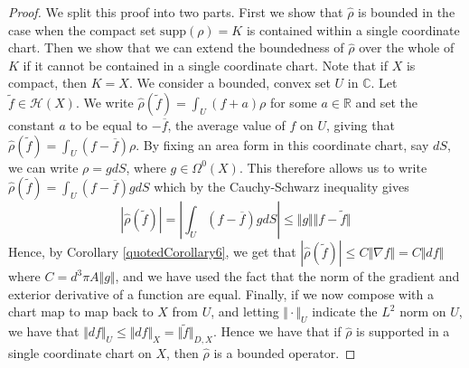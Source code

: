 \documentclass[11pt]{report}
\theoremstyle{definition}
\begin{document}
\begin{proof}
  We split this proof into two parts. First we show that $\hat{\rho}$ is bounded in the case when the compact set $\text{supp}(\rho) = K$ is contained within a single coordinate chart. Then we show that we can extend the boundedness of $\hat{\rho}$ over the whole of $K$ if it cannot be contained in a single coordinate chart. Note that if $X$ is compact, then $K=X$. We consider a bounded, convex set $U$ in $\mathbb{C}$. Let $\tilde{f} \in \mathcal{H}(X)$. We write $\hat{\rho}(\tilde{f}) = \int_U (f + a) \rho$ for some $a \in \mathbb{R}$ and set the constant $a$ to be equal to $-\overline{f}$, the average value of $f$ on $U$, giving that  $\hat{\rho}(\tilde{f}) = \int_U (f - \overline{f}) \rho$. By fixing an area form in this coordinate chart, say $dS$, we can write $\rho = g dS$, where $g \in \Omega^0(X)$. This therefore allows us to write $\hat{\rho}(\tilde{f}) = \int_U (f - \overline{f}) g dS$ which by the Cauchy-Schwarz inequality gives
  \[ |\hat{\rho}(\tilde{f})| = \left| \int_U (f - \overline{f}) g dS \right| \leq \Vert g \Vert \Vert f-\tilde{f} \Vert  \]
  Hence, by Corollary \ref{quotedCorollary6}, we get that $|\hat{\rho}(\tilde{f})| \leq C \Vert \nabla f \Vert = C \Vert df \Vert$ where $C = d^3\pi A \Vert g \Vert$, and we have used the fact that the norm of the gradient and exterior derivative of a function are equal.
  Finally, if we now compose with a chart map to map back to $X$ from $U$, and letting $ \Vert \cdot \Vert_U$ indicate the $L^2$ norm on $U$, we have that $ \Vert df \Vert_U \leq \Vert df \Vert_X = \Vert \tilde{f} \Vert_{D,X}$. Hence we have that if $\hat{\rho}$ is supported in a single coordinate chart on $X$, then $\hat{\rho}$ is a bounded operator.


\end{proof}
\end{document}
